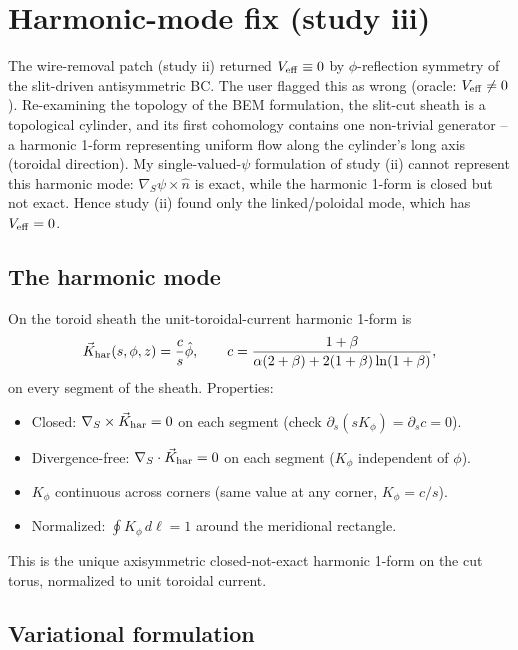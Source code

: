 \documentclass[11pt]{article}
\begin{document}
\section{Harmonic-mode fix (study iii)}
\label{sec:harmonic}

The wire-removal patch (study ii) returned $V_{\rm eff}\equiv 0$ by
$\phi$-reflection symmetry of the slit-driven antisymmetric BC.  The
user flagged this as wrong (oracle: $V_{\rm eff}\ne 0$).  Re-examining
the topology of the BEM formulation, the slit-cut sheath is a
topological cylinder, and its first cohomology contains one
non-trivial generator -- a harmonic 1-form representing uniform flow
along the cylinder's long axis (toroidal direction).  My
single-valued-$\psi$ formulation of study (ii) cannot represent this
harmonic mode: $\nabla_S\psi\times\hat n$ is exact, while the
harmonic 1-form is closed but not exact.  Hence study (ii) found
only the linked/poloidal mode, which has $V_{\rm eff}=0$.

\subsection{The harmonic mode}

On the toroid sheath the unit-toroidal-current harmonic 1-form is
\begin{equation}
\vec K_{\rm har}(s,\phi,z) = \frac{c}{s}\hat\phi,
\qquad
c = \frac{1+\beta}{\alpha(2+\beta) + 2(1+\beta)\ln(1+\beta)},
\end{equation}
on every segment of the sheath.  Properties:
\begin{itemize}
\item Closed: $\nabla_S\times\vec K_{\rm har}=0$ on each segment
(check $\partial_s(s K_\phi)=\partial_s c = 0$).
\item Divergence-free: $\nabla_S\cdot\vec K_{\rm har}=0$ on each
segment ($K_\phi$ independent of $\phi$).
\item $K_\phi$ continuous across corners (same value at any
corner, $K_\phi=c/s$).
\item Normalized: $\oint K_\phi\,d\ell = 1$ around the meridional
rectangle.
\end{itemize}
This is the unique axisymmetric closed-not-exact harmonic 1-form on
the cut torus, normalized to unit toroidal current.

\subsection{Variational formulation}
\end{document}
